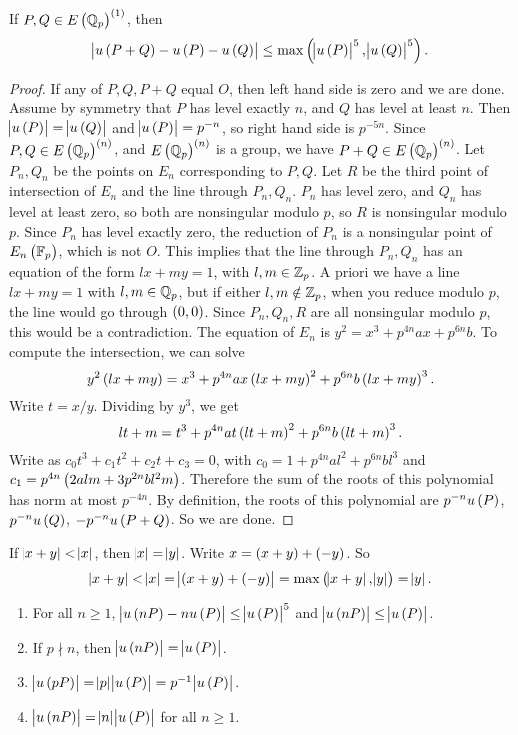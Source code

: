 \begin{lemma}
\label{lem:7.5}
If $ P, Q \in E\br{\Q_p}^{\br{1}} $, then
$$ \abs{u\br{P + Q} - u\br{P} - u\br{Q}} \le \max\br{\abs{u\br{P}}^5, \abs{u\br{Q}}^5}. $$
\end{lemma}

\begin{proof}
If any of $ P, Q, P + Q $ equal $ O $, then left hand side is zero and we are done. Assume by symmetry that $ P $ has level exactly $ n $, and $ Q $ has level at least $ n $. Then $ \abs{u\br{P}} = \abs{u\br{Q}} $ and $ \abs{u\br{P}} = p^{-n} $, so right hand side is $ p^{-5n} $. Since $ P, Q \in E\br{\Q_p}^{\br{n}} $, and $ E\br{\Q_p}^{\br{n}} $ is a group, we have $ P + Q \in E\br{\Q_p}^{\br{n}} $. Let $ P_n, Q_n $ be the points on $ E_n $ corresponding to $ P, Q $. Let $ R $ be the third point of intersection of $ E_n $ and the line through $ P_n, Q_n $. $ P_n $ has level zero, and $ Q_n $ has level at least zero, so both are nonsingular modulo $ p $, so $ R $ is nonsingular modulo $ p $. Since $ P_n $ has level exactly zero, the reduction of $ P_n $ is a nonsingular point of $ E_n\br{\F_p} $, which is not $ O $. This implies that the line through $ P_n, Q_n $ has an equation of the form $ lx + my = 1 $, with $ l, m \in \mathbb{Z}_p $. A priori we have a line $ lx + my = 1 $ with $ l, m \in \mathbb{Q}_p $, but if either $ l, m \notin \mathbb{Z}_p $, when you reduce modulo $ p $, the line would go through $ \br{0, 0} $. Since $ P_n, Q_n, R $ are all nonsingular modulo $ p $, this would be a contradiction. The equation of $ E_n $ is $ y^2 = x^3 + p^{4n}ax + p^{6n}b $. To compute the intersection, we can solve
$$ y^2\br{lx + my} = x^3 + p^{4n}ax\br{lx + my}^2 + p^{6n}b\br{lx + my}^3. $$
Write $ t = x / y $. Dividing by $ y^3 $, we get
$$ lt + m = t^3 + p^{4n}at\br{lt + m}^2 + p^{6n}b\br{lt + m}^3. $$
Write as $ c_0t^3 + c_1t^2 + c_2t + c_3 = 0 $, with $ c_0 = 1 + p^{4n}al^2 + p^{6n}bl^3 $ and $ c_1 = p^{4n}\br{2alm + 3p^{2n}bl^2m} $. Therefore the sum of the roots of this polynomial has norm at most $ p^{-4n} $. By definition, the roots of this polynomial are $ p^{-n}u\br{P} $, $ p^{-n}u\br{Q} $, $ -p^{-n}u\br{P + Q} $. So we are done.
\end{proof}


If $ \abs{x + y} < \abs{x} $, then $ \abs{x} = \abs{y} $. Write $ x = \br{x + y} + \br{-y} $. So
$$ \abs{x + y} < \abs{x} = \abs{\br{x + y} + \br{-y}} = \max\br{\abs{x + y}, \abs{y}} = \abs{y}. $$

\begin{corollary}
\hfill
\begin{enumerate}
\item For all $ n \ge 1 $, $ \abs{u\br{nP} - nu\br{P}} \le \abs{u\br{P}}^5 $ and $ \abs{u\br{nP}} \le \abs{u\br{P}} $.
\item If $ p \nmid n $, then $ \abs{u\br{nP}} = \abs{u\br{P}} $.
\item $ \abs{u\br{pP}} = \abs{p}\abs{u\br{P}} = p^{-1}\abs{u\br{P}} $.
\item $ \abs{u\br{nP}} = \abs{n}\abs{u\br{P}} $ for all $ n \ge 1 $.
\end{enumerate}
\end{corollary}

